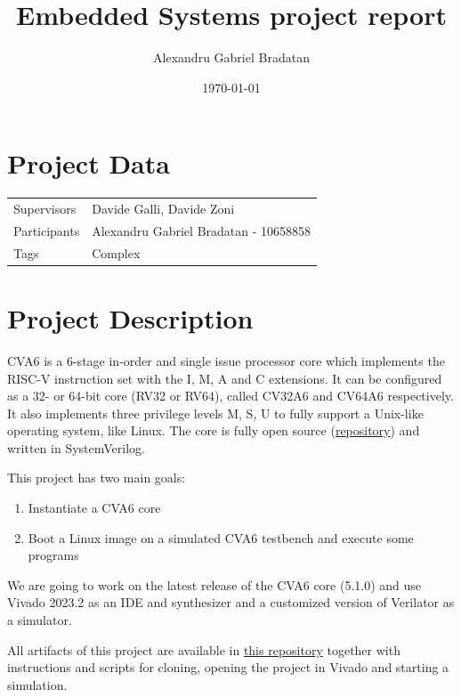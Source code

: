 \documentclass[a4paper,11pt]{article}
\title{Embedded Systems project report}
\author{Alexandru Gabriel Bradatan}
\date{\today}
\begin{document}
\maketitle
\tableofcontents

\section{Project Data}

\begin{table}[H]
  \centering
  \begin{tabular}{ll}
    \toprule
    Supervisors   & Davide Galli, Davide Zoni \\
    Participants  & Alexandru Gabriel Bradatan - 10658858 \\
    Tags          & Complex \\
    \bottomrule
  \end{tabular}
\end{table}

\section{Project Description}

CVA6 is a 6-stage in-order and single issue processor core which implements the
RISC-V instruction set with the I, M, A and C extensions. It can be configured
as a 32- or 64-bit core (RV32 or RV64), called CV32A6 and CV64A6 respectively.
It also implements three privilege levels M, S, U to fully support a Unix-like
operating system, like Linux. The core is fully open source
(\href{https://github.com/openhwgroup/cva6}{repository}) and written in SystemVerilog.

This project has two main goals:

\begin{enumerate}
  \item Instantiate a CVA6 core
  \item Boot a Linux image on a simulated CVA6 testbench and execute some programs
\end{enumerate}

We are going to work on the latest release of the CVA6 core (5.1.0) and use
Vivado 2023.2 as an IDE and synthesizer and a customized version of Verilator
as a simulator.

All artifacts of this project are available in \href{https://github.com/alexbradd/embedded-systems-project-2024}{this repository}
together with instructions and scripts for cloning, opening the project in Vivado
and starting a simulation.
\end{document}
